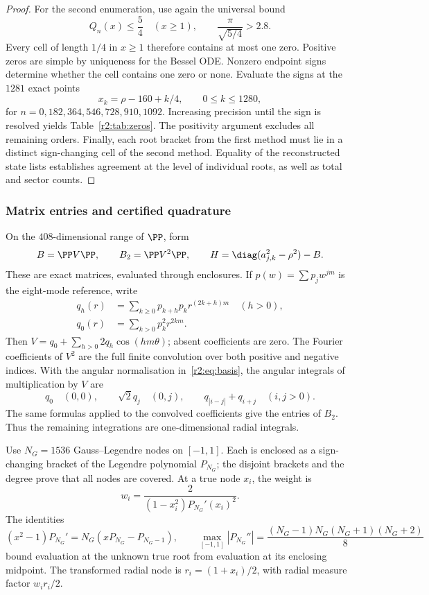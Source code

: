 \begin{proof}
For the second enumeration, use again the universal bound
\[
 Q_n(x)\le\frac54\quad(x\ge1),\qquad
 \frac{\pi}{\sqrt{5/4}}>2.8.
\]
Every cell of length $1/4$ in $x\ge1$ therefore contains at most one zero. Positive zeros are simple by uniqueness for the Bessel ODE. Nonzero endpoint signs determine whether the cell contains one zero or none. Evaluate the signs at the $1281$ exact points
\begin{equation}\label{r2:eq:sign-grid}
 x_k=\rho-160+k/4,\qquad 0\le k\le1280,
\end{equation}
for $n=0,182,364,546,728,910,1092$. Increasing precision until the sign is resolved yields Table~\ref{r2:tab:zeros}. The positivity argument excludes all remaining orders. Finally, each root bracket from the first method must lie in a distinct sign-changing cell of the second method. Equality of the reconstructed state lists establishes agreement at the level of individual roots, as well as total and sector counts.
\end{proof}

\subsubsection{Matrix entries and certified quadrature}
On the $408$-dimensional range of $\PP$, form
\begin{equation}\label{r2:eq:matrices}
 B=\PP V\PP,\qquad B_2=\PP V^2\PP,\qquad
 H=\diag(a_{j,k}^2-\rho^2)-B.
\end{equation}
These are exact matrices, evaluated through enclosures. If $p(w)=\sum p_jw^{jm}$ is the eight-mode reference, write
\begin{align*}
 q_h(r)&=\sum_{k\ge0}p_{k+h}p_kr^{(2k+h)m}\quad(h>0),\\
 q_0(r)&=\sum_{k>0}p_k^2r^{2km}.
\end{align*}
Then $V=q_0+\sum_{h>0}2q_h\cos(hm\theta)$; absent coefficients are zero. The Fourier coefficients of $V^2$ are the full finite convolution over both positive and negative indices. With the angular normalisation in~\eqref{r2:eq:basis}, the angular integrals of multiplication by $V$ are
\[
 q_0\quad(0,0),\qquad
 \sqrt2q_j\quad(0,j),\qquad
 q_{|i-j|}+q_{i+j}\quad(i,j>0).
\]
The same formulas applied to the convolved coefficients give the entries of $B_2$. Thus the remaining integrations are one-dimensional radial integrals.

Use $N_G=1536$ Gauss--Legendre nodes on $[-1,1]$. Each is enclosed as a sign-changing bracket of the Legendre polynomial $P_{N_G}$; the disjoint brackets and the degree prove that all nodes are covered. At a true node $x_i$, the weight is
\[
 w_i=\frac{2}{(1-x_i^2)P_{N_G}'(x_i)^2}.
\]
The identities
\[
 (x^2-1)P_{N_G}'=N_G(xP_{N_G}-P_{N_G-1}),\qquad
 \max_{[-1,1]}|P_{N_G}''|
 =\frac{(N_G-1)N_G(N_G+1)(N_G+2)}8
\]
bound evaluation at the unknown true root from evaluation at its enclosing midpoint. The transformed radial node is $r_i=(1+x_i)/2$, with radial measure factor $w_i r_i/2$.

